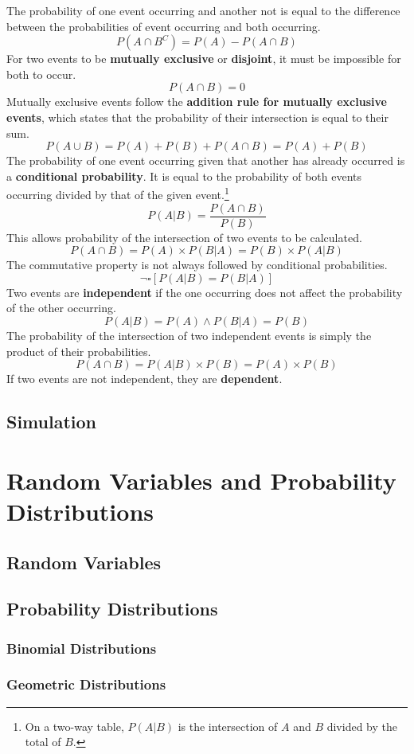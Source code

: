 \documentclass[../AP_Statistics.tex]{subfiles}
\begin{document}
		The probability of one event occurring and another not is equal to the difference between the probabilities of event occurring and both occurring.
		$$P\left(A\cap B^C\right) = P(A) - P(A\cap B)$$
		For two events to be \textbf{mutually exclusive} or \textbf{disjoint}, it must be impossible for both to occur.
		$$P(A\cap B) = 0$$
		Mutually exclusive events follow the \textbf{addition rule for mutually exclusive events}, which states that the probability of their intersection is equal to their sum.
		$$P(A\cup B) = P(A) + P(B) + P(A\cap B) = P(A) + P(B)$$
		The probability of one event occurring given that another has already occurred is a \textbf{conditional probability}. It is equal to the probability of both events occurring divided by that of the given event.\footnote{On a two-way table, $P(A|B)$ is the intersection of $A$ and $B$ divided by the total of $B$.}
		$$P(A|B) = \frac{P(A\cap B)}{P(B)}$$
		This allows probability of the intersection of two events to be calculated.
		$$P(A\cap B) = P(A) \times P(B|A) = P(B) \times P(A|B)$$
		The commutative property is not always followed by conditional probabilities.
		$$\lnot\square[P(A|B) = P(B|A)]$$
		Two events are \textbf{independent} if the one occurring does not affect the probability of the other occurring.
		$$P(A|B) = P(A) \land P(B|A) = P(B)$$
		The probability of the intersection of two independent events is simply the product of their probabilities.
		$$P(A\cap B) = P(A|B) \times P(B) = P(A) \times P(B)$$
		If two events are not independent, they are \textbf{dependent}.
		\section*{Simulation}
	\chapter{Random Variables and Probability Distributions}
		\section{Random Variables}
		\section{Probability Distributions}
			\subsection{Binomial Distributions}
			\subsection{Geometric Distributions}
\end{document}
